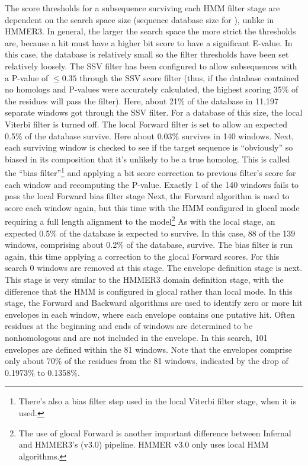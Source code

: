 The score thresholds for a subsequence surviving each HMM filter stage
are dependent on the search space size (sequence database size for
), unlike in HMMER3. In general, the larger the search
space the more strict the thresholds are, because a hit must have a
higher bit score to have a significant E-value.  In this case, the
database is relatively small so the filter thresholds have been set
relatively loosely. The SSV filter has been configured to allow
subsequences with a P-value of $\leq 0.35$ through
the SSV score filter (thus, if the database contained no homologs and
P-values were accurately calculated, the highest scoring 35\% of the
residues will pass the filter). Here, about 21\% of the database in
11,197 separate windows got through the SSV filter. For a database of
this size, the local Viterbi filter is turned off.  The local Forward filter
is set to allow an expected 0.5\% of the database survive. Here about
0.03\% survives in 140 windows. Next, each surviving window is checked
to see if the target sequence is ``obviously'' so biased in its
composition that it's unlikely to be a true homolog. This is called
the ``bias filter''\footnote{There's also a bias filter step used in
  the local Viterbi filter stage, when it is used.} and applying a bit
score correction to previous filter's score for each window and
recomputing the P-value. Exactly 1 of the 140 windows fails to pass
the local Forward bias filter stage Next, the Forward algorithm is
used to score each window again, but this time with the HMM configured
in glocal mode requiring a full length alignment to the
model\footnote{The use of glocal Forward is another important
  difference between Infernal and HMMER3's (v3.0) pipeline. HMMER v3.0
  only uses local HMM algorithms.}  As with the local stage, an
expected 0.5\% of the database is expected to survive. In this case,
88 of the 139 windows, comprising about 0.2\% of the database,
survive. The bias filter is run again, this time applying a correction
to the glocal Forward scores. For this search 0 windows are removed at
this stage. The envelope definition stage is next. This stage is very
similar to the HMMER3 domain definition stage, with the difference
that the HMM is configured in glocal rather than local mode. In this
stage, the Forward and Backward algorithms are used to identify zero
or more hit envelopes in each window, where each envelope contains one
putative hit.  Often residues at the beginning and ends of windows are
determined to be nonhomologous and are not included in the
envelope. In this search, 101 envelopes are defined within the 81
windows. Note that the envelopes comprise only about 70\% of the
residues from the 81 windows, indicated by the drop of 0.1973\% to
0.1358\%.

